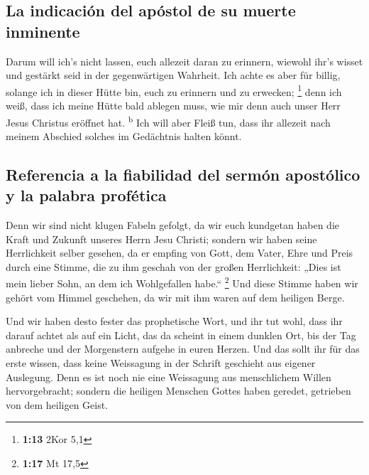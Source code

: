 \hypertarget{la-indicaciuxf3n-del-apuxf3stol-de-su-muerte-inminente}{%
\subsection{La indicación del apóstol de su muerte
inminente}\label{la-indicaciuxf3n-del-apuxf3stol-de-su-muerte-inminente}}

 Darum will ich's nicht lassen, euch allezeit daran zu
erinnern, wiewohl ihr's wisset und gestärkt seid in der gegenwärtigen
Wahrheit.  Ich achte es aber für billig, solange ich in
dieser Hütte bin, euch zu erinnern und zu erwecken; \footnote{\textbf{1:13}
  2Kor 5,1}  denn ich weiß, dass ich meine Hütte bald
ablegen muss, wie mir denn auch unser Herr Jesus Christus eröffnet hat.
\textsuperscript{b}  Ich will aber Fleiß tun, dass ihr
allezeit nach meinem Abschied solches im Gedächtnis halten könnt.

\hypertarget{referencia-a-la-fiabilidad-del-sermuxf3n-apostuxf3lico-y-la-palabra-profuxe9tica}{%
\subsection{Referencia a la fiabilidad del sermón apostólico y la
palabra
profética}\label{referencia-a-la-fiabilidad-del-sermuxf3n-apostuxf3lico-y-la-palabra-profuxe9tica}}

 Denn wir sind nicht klugen Fabeln gefolgt, da wir euch
kundgetan haben die Kraft und Zukunft unseres Herrn Jesu Christi;
sondern wir haben seine Herrlichkeit selber gesehen,  da
er empfing von Gott, dem Vater, Ehre und Preis durch eine Stimme, die zu
ihm geschah von der großen Herrlichkeit: „Dies ist mein lieber Sohn, an
dem ich Wohlgefallen habe.`` \footnote{\textbf{1:17} Mt 17,5}
 Und diese Stimme haben wir gehört vom Himmel geschehen,
da wir mit ihm waren auf dem heiligen Berge.

 Und wir haben desto fester das prophetische Wort, und
ihr tut wohl, dass ihr darauf achtet als auf ein Licht, das da scheint
in einem dunklen Ort, bis der Tag anbreche und der Morgenstern aufgehe
in euren Herzen.  Und das sollt ihr für das erste wissen,
dass keine Weissagung in der Schrift geschieht aus eigener Auslegung.
 Denn es ist noch nie eine Weissagung aus menschlichem
Willen hervorgebracht; sondern die heiligen Menschen Gottes haben
geredet, getrieben von dem heiligen Geist.

